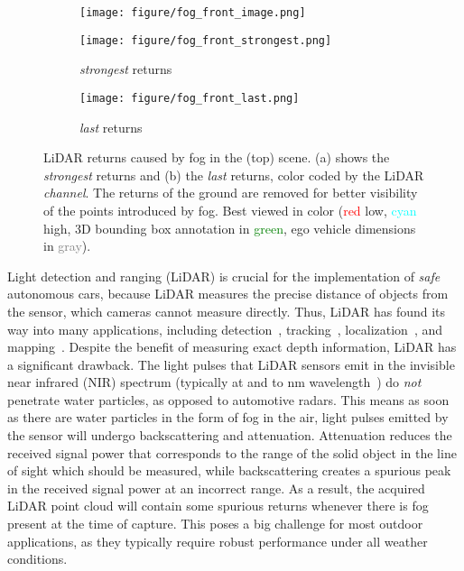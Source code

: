 \documentclass[10pt,twocolumn,letterpaper]{article}
\begin{document}
\begin{figure}
     \centering
     \begin{subfigure}[b]{\linewidth}
         \centering
         \texttt{[image: figure/fog\_front\_image.png]}
     \end{subfigure}
     \begin{subfigure}[b]{0.495\linewidth}
         \centering
         \texttt{[image: figure/fog\_front\_strongest.png]}
         \caption{\textit{strongest} returns}
         \label{fig:fog_front_strongest}
     \end{subfigure}
     \hfill
     \begin{subfigure}[b]{0.495\linewidth}
         \centering
         \texttt{[image: figure/fog\_front\_last.png]}
         \caption{\textit{last} returns}
         \label{fig:fog_front_last}
     \end{subfigure}
     \caption{LiDAR returns caused by fog in the (top) scene. (a) shows the \textit{strongest} returns and (b) the \textit{last} returns, color coded by the LiDAR \textit{channel}. 
     The returns of the ground are removed for better visibility of the points introduced by fog.
     Best viewed in color (\textcolor{red}{red}  low, \textcolor{cyan}{cyan}  high, 
     3D bounding box annotation in \textcolor{green}{green}, ego vehicle dimensions in \textcolor{gray}{gray}).}
     \label{fig:fog_front}
\end{figure}

Light detection and ranging (LiDAR) is crucial for the implementation of \textit{safe} autonomous cars, because LiDAR measures the precise distance of objects from the sensor, which cameras cannot measure directly. Thus, LiDAR has found its way into many applications, including detection~\cite{PP, PV-RCNN}, tracking~\cite{tracking, robotics8030075}, localization~\cite{localization, survey}, and mapping~\cite{LOAM, SLAM}. Despite the benefit of measuring exact depth information, LiDAR has a significant drawback. The light pulses that LiDAR sensors emit in the invisible near infrared (NIR) spectrum (typically at  and  to  nm wavelength~\cite{LIBRE}) do \textit{not} penetrate water particles, as opposed to automotive radars. This means as soon as there are water particles in the form of fog in the air, light pulses emitted by the sensor will undergo backscattering and attenuation. Attenuation reduces the received signal power that corresponds to the range of the solid object in the line of sight which should be measured, while backscattering creates a spurious peak in the received signal power at an incorrect range. As a result, the acquired LiDAR point cloud will contain some spurious returns whenever there is fog present at the time of capture. This poses a big challenge for most outdoor applications, as they typically require robust performance under all weather conditions.
\end{document}
